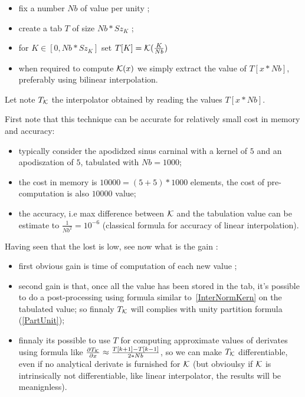 \begin{itemize}
    \item  fix a number $Nb$  of value per unity ;
    \item  create a tab $T$ of size $Nb*Sz_K$ ;
    \item for $K \in [0,Nb*Sz_K]$  set  $ T[K] = \mathcal K(\frac{K}{Nb})$
    \item when required to compute $\mathcal K(x)$  we simply extract the value of $T[x*Nb]$,
          preferably using bilinear interpolation.
\end{itemize}

Let note $T_\mathcal K$  the interpolator obtained by reading the values  $T[x*Nb]$.

First note that this technique can be accurate for relatively small cost in memory and accuracy:

\begin{itemize}
     \item typically consider the apodidzed sinus carninal with a kernel of $5$ and an apodiszation of $5$, tabulated with $Nb=1000$;
     \item the  cost in memory is $10000=(5+5)*1000$ elements, the cost of pre-computation is also $10000$  value;
     \item the  accuracy, i.e max difference between $\mathcal K$ and the tabulation value can be estimate to $\frac{1}{Nb^2} = 10^{-6}$
           (classical formula for accuracy of linear interpolation).
\end{itemize}

Having seen that the lost is low, see now what is the gain :

\begin{itemize}
    \item first obvious gain is time of computation of each new value ;

    \item second gain is that, once all the value has been stored in the tab, it's possible to do a post-processing
          using formula  similar to~\ref{InterNormKern} on the tabulated value; so finnaly $T_\mathcal K$ will 
          complies with unity partition formula (\ref{PartUnit});

    \item finnaly its possible to use $T$ for computing approximate values of derivates using formula
          like  $\frac{\partial T_\mathcal K}{\partial x} \approx \frac{T[k+1]-T[k-1]}{2*Nb}$, so we can
          make $T_\mathcal K$ differentiable, even if no analytical derivate is furnished for $\mathcal K$
          (but obvioulsy if $\mathcal K$ is intrinsically not differentiable, like linear interpolator, the
           results will be meanignless).
\end{itemize}

